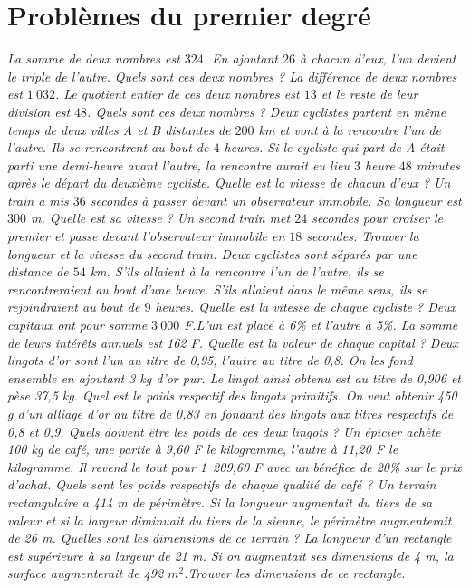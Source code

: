 \section*{Problèmes du premier degré}
\begin{itemize}
\it La somme de deux nombres est $324$. En ajoutant $26$ à chacun d'eux, l'un devient le triple de l'autre. Quels sont ces deux nombres ? 
\it La différence de deux nombres est $1~032$. Le quotient entier de ces deux nombres est $13$ et le reste de leur division est $48$. Quels sont ces deux nombres ? 
\it Deux cyclistes partent en même temps de deux villes A et B distantes de $200$ km et vont à la rencontre l'un de l'autre. Ils se rencontrent au bout de $4$ heures. Si le cycliste qui part de A était parti une demi-heure avant l'autre, la rencontre aurait eu lieu $3$ heure $48$ minutes après le départ du deuxième cycliste. Quelle est la vitesse de chacun d'eux ? 
\it Un train a mis $36$ secondes à passer devant un observateur immobile. Sa longueur est $300$ m. Quelle est sa vitesse ? Un second train met $24$ secondes pour croiser le premier et passe devant l'observateur immobile en $18$ secondes. Trouver la longueur et la vitesse du second train. 
\it Deux cyclistes sont séparés par une distance de $54$ km. S'ils allaient à la rencontre l'un de l'autre, ils se rencontreraient au bout d'une heure. S'ils allaient dans le même sens, ils se rejoindraient au bout de $9$ heures. Quelle est la vitesse de chaque cycliste ? 
\it Deux capitaux ont pour somme $3~000$ F.L'un est placé à 6\% et l'autre à 5\%. La somme de leurs intérêts annuels est 162 F. Quelle est la valeur de chaque capital ? 
\it Deux lingots d'or sont l'un au titre de 0,95, l'autre au titre de 0,8. On les fond ensemble en ajoutant 3 kg d'or pur. Le lingot ainsi obtenu est au titre de 0,906 et pèse 37,5 kg. Quel est le poids respectif des lingots primitifs. 
\it On veut obtenir 450 g d'un alliage d'or au titre de 0,83 en fondant des lingots aux titres respectifs de 0,8 et 0,9. Quels doivent être les poids de ces deux lingots ? 
\it Un épicier achète 100 kg de café, une partie à 9,60 F le kilogramme, l'autre à 11,20 F le kilogramme. Il revend le tout pour 1~209,60 F avec un bénéfice de 20\% sur le prix d'achat. Quels sont les poids respectifs de chaque qualité de café ? 
\it Un terrain rectangulaire a 414 m de périmètre. Si la longueur augmentait du tiers de sa valeur et si la largeur diminuait du tiers de la sienne, le périmètre augmenterait de 26 m. Quelles sont les dimensions de ce  terrain ? 
\it La longueur d'un rectangle est supérieure à sa largeur de 21 m. Si on augmentait ses dimensions de 4 m, la surface augmenterait de 492 $m^2$.Trouver les dimensions de ce rectangle. 

\end{itemize}
